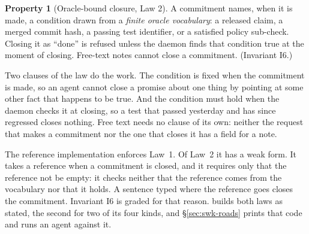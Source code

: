 \documentclass[11pt,a4paper]{article}
\theoremstyle{definition}
\newtheorem{property}{Property}[section]
\theoremstyle{remark}
\begin{document}
\begin{property}[Oracle-bound closure, Law 2]\label{prop:law2}
\setlength{\parskip}{4pt plus 1pt}
A commitment names, when it is made, a condition drawn from a \emph{finite
oracle vocabulary}: a released claim, a merged commit hash, a passing test
identifier, or a satisfied policy sub-check. Closing it as ``done'' is refused
unless the daemon finds that condition true at the moment of closing. Free-text
notes cannot close a commitment. (Invariant I6.)
\end{property}

Two clauses of the law do the work. The condition is fixed when the
commitment is made, so an agent cannot close a promise about one thing by
pointing at some other fact that happens to be true. And the condition must
hold when the daemon checks it at closing, so a test that passed yesterday
and has since regressed closes nothing. Free text needs no clause of its
own: neither the request that makes a commitment nor the one that closes it
has a field for a note.

The reference implementation enforces Law~1. Of Law~2 it has a weak form. It
takes a reference when a commitment is closed, and it requires only that the
reference not be empty: it checks neither that the reference comes from the
vocabulary nor that it holds. A sentence typed where the reference goes
closes the commitment. Invariant I6 is graded \BuiltWeak{} for that reason.
\pdkernelname{} builds both laws as stated, the second for two of its four
kinds, and \S\ref{sec:swk-roads} prints that code and runs an agent against
it.




\end{document}
